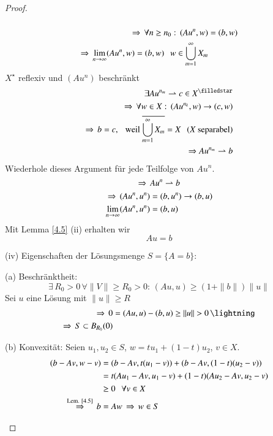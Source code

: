 \begin{proof}
\begin{description}
\[    \]
    \begin{align*}
        \Rightarrow \, \forall n\geq n_0: \, (Au^n,w)&=(b,w)\\
        \Rightarrow \, \lim_{n\rightarrow \infty} (Au^n,w)=(b,w) \hspace{.25cm} w\in \bigcup_{m=1}^\infty X_m
    \end{align*}
    $X^\star$ reflexiv und $(Au^n)$ beschränkt
    \begin{align*}
        \exists Au^{n_m}\rightharpoonup c \in X^\star\\
        \Ra \, \forall w\in X: \, (Au^{n_k},w)\ra (c,w)\\
        \Ra \, b=c, \qq \text{weil } \ol{\bigcup_{m=1}^\infty X_m}=X \qq (X \text{ separabel})\\
        \Ra Au^{n_m} \rightharpoonup b
    \end{align*}
    Wiederhole dieses Argument für jede Teilfolge von $Au^n$.
    \[
        \Rightarrow \, Au^n\rightharpoonup b
    \]
    \begin{align*}
        \Rightarrow \, (Au^n,u^n)&=(b,u^n)\rightarrow (b,u)\\
        \lim_{n\rightarrow \infty} (Au^n,u^n)&= (b,u)
    \end{align*}
    Mit Lemma \ref{4.5} (ii) erhalten wir
    \[ 
        Au=b
    \]
    \item{(iv)}
    Eigenschaften der Lösungsmenge $S=\{A=b\}$:
    \begin{description}
    \item{(a) Beschränktheit:}
    \[
        \exists \, R_0>0 \, \forall \|V\|\geq R_0>0: \, (Au,u)\geq (1+\|b\|)\|u\|
    \]
    Sei $u$ eine Lösung mit $\|u\|\geq R$
    \begin{align*}
        \Ra \, 0&=(Au,u) -(b,u)\geq \|u\|>0 \, \lightning\\
        \Ra \, S\subset B_{R_0}(0)
    \end{align*}
    \item{(b) Konvexität:}
    Seien $u_1,u_2\in S$, $w=tu_1+(1-t)u_2$, $v\in X$.
    \begin{align*}
        (b-Av,w-v)&=(b-Av,t(u_1-v))+(b-Av,(1-t)(u_2-v))\\
                 &= t(Au_1-Av,u_1-v)+(1-t)(Au_2-Av,u_2-v)\\
                 &\geq 0 \hspace{.25cm} \forall v\in X\\
        \overset{\text{Lem. \ref{4.5}}}{\Rightarrow} \, b&=Aw \, \Rightarrow \, w\in S 
    \end{align*}
    \end{description}
    \end{description}
    \[ \]
\end{proof}

